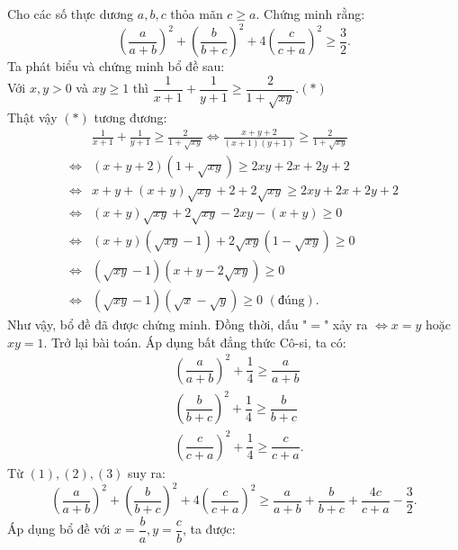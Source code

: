 \begin{ex}%
  Cho các số thực dương $a,b,c$ thỏa mãn $c\ge a.$ Chứng minh rằng:
  $$\left(\dfrac{a}{a+b}\right)^2+\left(\dfrac{b}{b+c}\right)^2+4\left(\dfrac{c}{c+a}\right)^2\ge \dfrac{3}{2}.$$
\loigiai
    {Ta phát biểu và chứng minh bổ đề sau:\\
    	  Với $x, y>0$ và $xy\ge 1$ thì
$\dfrac{1}{x+1}+\dfrac{1}{y+1}\ge\dfrac{2}{1+\sqrt{xy}}$.\hfill$(*)$\\
    	Thật vậy $(*)$  tương đương:
    	{\allowdisplaybreaks
    	\begin{align*}
    	&\frac{1}{{x + 1}} + \frac{1}{{y + 1}} \ge \frac{2}{{1 + \sqrt {xy} }} \Leftrightarrow \frac{{x + y + 2}}{{(x + 1)(y + 1)}} \ge \frac{2}{{1 + \sqrt {xy} }}\\
    	\Leftrightarrow& \left( {x + y + 2} \right)\left( {1 + \sqrt {xy} } \right) \ge 2xy + 2x + 2y + 2\\
    	\Leftrightarrow& x + y + (x + y)\sqrt {xy}  + 2 + 2\sqrt {xy}  \ge 2xy + 2x + 2y + 2\\
    	\Leftrightarrow& (x + y)\sqrt {xy}  + 2\sqrt {xy}  - 2xy - (x + y) \ge 0\\
    	\Leftrightarrow& \left( {x + y} \right)\left( {\sqrt {xy}  - 1} \right) + 2\sqrt {xy} \left( {1 - \sqrt {xy} } \right) \ge 0\\
    	\Leftrightarrow& \left( {\sqrt {xy}  - 1} \right)\left( {x + y - 2\sqrt {xy} } \right) \ge 0\\
    	\Leftrightarrow& \left( {\sqrt {xy}  - 1} \right)\left( {\sqrt x  - \sqrt y } \right) \ge 0\,\,(\text{đúng}).
    	\end{align*}}Như vậy, bổ đề đã được chứng minh. Đồng thời, dấu "$=$" xảy ra $\Leftrightarrow x=y$ hoặc $xy=1.$ Trở lại bài toán. 
   Áp dụng bất đẳng thức Cô-si, ta có:
   {\allowdisplaybreaks
   	\begin{align*}
   &\left(\dfrac{a}{a+b}\right)^2+\dfrac{1}{4}\ge \dfrac{a}{a+b}\tag{1}\\
   &\left(\dfrac{b}{b+c}\right)^2+\dfrac{1}{4}\ge \dfrac{b}{b+c}\tag{2}\\
   &\left(\dfrac{c}{c+a}\right)^2+\dfrac{1}{4}\ge \dfrac{c}{c+a}.\tag{3}
   \end{align*}}Từ $(1),(2),(3)$ suy ra:
    $$\left(\dfrac{a}{a+b}\right)^2+\left(\dfrac{b}{b+c}\right)^2+4\left(\dfrac{c}{c+a}\right)^2\ge \dfrac{a}{a+b}+\dfrac{b}{b+c}+\dfrac{4c}{c+a}-\dfrac{3}{2}.$$
   Áp dụng bổ đề với $x=\dfrac{b}{a}, y=\dfrac{c}{b}$, ta được:
}
\end{ex}
